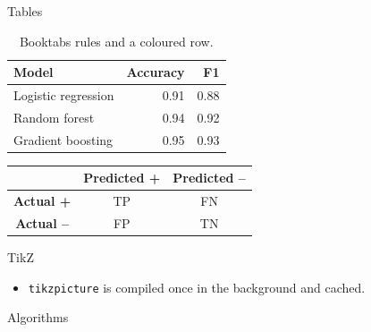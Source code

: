 \begin{frame}{Tables}
  \begin{table}
    \begin{tabular}{lrr}
      \toprule
      \textbf{Model} & \textbf{Accuracy} & \textbf{F1} \\
      \midrule
      Logistic regression & 0.91 & 0.88 \\
      Random forest & 0.94 & 0.92 \\
      \rowcolor{brand!15} Gradient boosting & 0.95 & 0.93 \\
      \bottomrule
    \end{tabular}
    \caption{Booktabs rules and a coloured row.}
  \end{table}
  \begin{center}
    \begin{tabular}{|c|c|c|}
      \hline
      & \textbf{Predicted +} & \textbf{Predicted --} \\
      \hline
      \textbf{Actual +} & TP & FN \\
      \hline
      \textbf{Actual --} & FP & TN \\
      \hline
    \end{tabular}
  \end{center}
\end{frame}

\begin{frame}{TikZ}
  \begin{center}
  \end{center}
  \begin{itemize}
    \item \texttt{tikzpicture} is compiled once in the background and cached.
  \end{itemize}
\end{frame}

\begin{frame}{Algorithms}
  \begin{algorithm}[H]
    \caption{K-Means(Dataset: $D$, Clusters: $k$)}
  \end{algorithm}
\end{frame}

